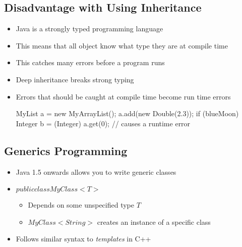 
\begin{slide}
\section{Disadvantage with Using Inheritance}

\vspace{-2cm}
\begin{PauseHighLight}
  \begin{itemize}
  \item Java is a strongly typed programming language\pause
  \item This means that all object know what type they are at compile
    time\pause
  \item This catches many errors before a program runs\pause
  \item Deep inheritance breaks strong typing\pause
  \item Errors that should be caught at compile time become run
    time errors
\begin{java}
        MyList a = new MyArrayList();
        a.add(new Double(2.3));
        if (blueMoon)
            Integer b = (Integer) a.get(0);  // causes a runtime error
\end{java}\pause
  \end{itemize}
\end{PauseHighLight}
\end{slide}



\Outline

\begin{slide}
\section{Generics Programming}

\begin{PauseHighLight}
  \begin{itemize}
  \item Java 1.5 onwards allows you to write generic classes\pause
  \item \jl$public class MyClass<T>$
    \begin{itemize}
    \item Depends on some unspecified type \jl$T$
    \item \jl$MyClass<String>$ creates an instance of a specific class
    \end{itemize}\pause
  \item Follows similar syntax to \textit{templates} in C++\pause
  \end{itemize}
\end{PauseHighLight}

\end{slide}

